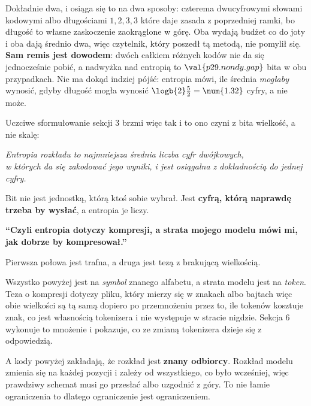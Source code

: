 \begin{fr}

Dokładnie dwa, i osiąga się to na dwa sposoby: czterema dwucyfrowymi słowami
kodowymi albo długościami $1, 2, 3, 3$ \dash{} które daje zasada z poprzedniej
ramki, bo długość to własne zaskoczenie zaokrąglone w górę. Oba wydają budżet
co do joty i oba dają średnio dwa, więc czytelnik, który poszedł tą metodą, nie
pomylił się. \textbf{Sam remis jest dowodem}: dwóch całkiem różnych kodów nie
da się jednocześnie pobić, a nadwyżka nad entropią to
$\val{p29.nondy.gap}$ bita w obu przypadkach. Nie ma dokąd indziej pójść:
entropia mówi, ile
średnia \emph{mogłaby} wynosić, gdyby długość mogła wynosić
$\logb{2} \frac{5}{2} = \num{1.32}$ cyfry, a nie może.

Uczciwe sformułowanie sekcji 3 brzmi więc tak i to ono czyni z bita wielkość,
a nie skalę:

\begin{center}
\emph{Entropia rozkładu to najmniejsza średnia liczba cyfr dwójkowych,\\
w których da się zakodować jego wyniki, i jest osiągalna z dokładnością do
jednej cyfry.}
\end{center}

Bit nie jest jednostką, którą ktoś sobie wybrał. Jest \textbf{cyfrą, którą
naprawdę trzeba by wysłać}, a entropia je liczy.
\end{fr}

\begin{fr}
\begin{trapbox}
\textbf{\enquote{Czyli entropia dotyczy kompresji, a strata mojego modelu mówi
mi, jak dobrze by kompresował.}}

Pierwsza połowa jest trafna, a druga jest tezą z brakującą wielkością.

Wszystko powyżej jest na \emph{symbol} znanego alfabetu, a strata modelu jest
na \emph{token}. Teza o kompresji dotyczy pliku, który mierzy się w znakach
albo bajtach \dash{} więc obie wielkości są tą samą dopiero po przemnożeniu
przez to, ile tokenów kosztuje znak, co jest własnością tokenizera i nie
występuje w stracie nigdzie. Sekcja 6 wykonuje to mnożenie i pokazuje, co ze
zmianą tokenizera dzieje się z odpowiedzią.

A kody powyżej zakładają, że rozkład jest \textbf{znany odbiorcy}. Rozkład
modelu zmienia się na każdej pozycji i zależy od wszystkiego, co było
wcześniej, więc prawdziwy schemat musi go przesłać albo uzgodnić z góry. To nie
łamie ograniczenia \dash{} to dlatego ograniczenie jest ograniczeniem.
\end{trapbox}
\end{fr}

